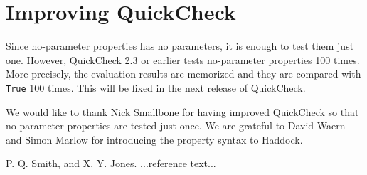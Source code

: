 \documentclass[preprint]{sigplanconf}
\begin{document}
\section{Improving QuickCheck}

Since no-parameter properties has no parameters, it is enough to test them
just one.
However, QuickCheck 2.3 or earlier tests no-parameter properties 100 times.
More precisely, the evaluation results are memorized and they are
compared with {\tt True} 100 times.
This will be fixed in the next release of QuickCheck.


\acks

We would like to thank
Nick Smallbone for having improved QuickCheck so that no-parameter properties are tested just once.
We are grateful to David Waern and Simon Marlow
for introducing the property syntax to Haddock.






\begin{thebibliography}{}
\softraggedright

P. Q. Smith, and X. Y. Jones. ...reference text...

\end{thebibliography}
\end{document}
